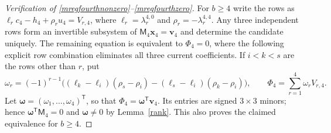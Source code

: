 \documentclass[12pt]{article}
\theoremstyle{remark}
\begin{document}
\begin{proof}[Verification of \eqref{mregfourthnonzero}--\eqref{mregfourthzero}]
For $b\ge4$ write the rows as
$\ell_rc_4-h_4+\rho_ru_4=V_{r,4}$, where
$\ell_r=\lambda_r^{4,0}$ and $\rho_r=-\lambda_r^{4,4}$.
Any three independent rows form an invertible subsystem of
$\mathsf M_4\mathbf x_4=\mathbf v_4$ and determine the candidate uniquely.  The remaining equation is equivalent
to $\Phi_4=0$, where the following explicit row combination eliminates
all three current coefficients.  If $i<k<s$ are the rows other than
$r$, put
\[
 \omega_r=(-1)^{r-1}
 \bigl((\ell_k-\ell_i)(\rho_s-\rho_i)
             -(\ell_s-\ell_i)(\rho_k-\rho_i)\bigr),
 \qquad
 \Phi_4=\sum_{r=1}^{4}\omega_rV_{r,4}.
\]
Let $\boldsymbol\omega=(\omega_1,\ldots,\omega_4)^{\mathsf T}$,
so that $\Phi_4=\boldsymbol\omega^{\mathsf T}\mathbf v_4$.
Its entries are signed $3\times3$ minors; hence
$\boldsymbol\omega^{\mathsf T}\mathsf M_4=0$ and
$\boldsymbol\omega\ne0$ by Lemma~\ref{rank}.
This also proves the claimed equivalence for $b\ge4$.


\end{proof}
\end{document}
